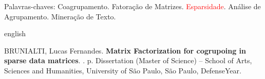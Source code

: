 \documentclass[
    12pt,                %
    oneside,            %
    a4paper,            %
    english,            %
    brazil                %
    ]{abntex2ppgsi}
\begin{document}
\begin{resumo}
Palavras-chaves: Coagrupamento. Fatoração de Matrizes. \textcolor{red}{Esparsidade}. Análise de Agrupamento. Mineração de Texto.
\end{resumo}

%
%
\begin{resumo}[Abstract]
\begin{otherlanguage*}{english}

%
%
%
%
\begin{flushleft}
BRUNIALTI, Lucas Fernandes. \textbf{Matrix Factorization for cogrupoing in sparse data matrices}. \imprimirdata. \pageref{LastPage} p. Dissertation (Master of Science) – School of Arts, Sciences and Humanities, University of São Paulo, São Paulo, DefenseYear.
\end{flushleft}


\end{otherlanguage*}
\end{resumo}
\end{document}

